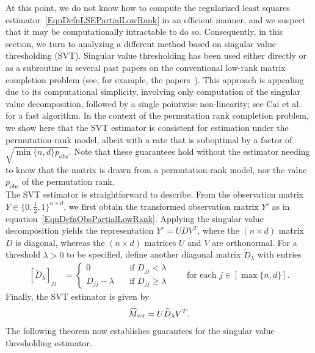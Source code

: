 \documentclass[11pt, hidelinks]{article} %
\newcommand{\numrows}{n}
\newcommand{\numcols}{d}
\newcommand{\wtmatrix}{M}
\newcommand{\wthat}{\widehat{\wtmatrix}}
\newcommand{\pp}{\ensuremath{p_{\mathrm{obs}}}}
\newcommand{\obs}{\ensuremath{Y}}
\newcommand{\regpar}{\ensuremath{\lambda}}
\newcommand{\Treg}{\ensuremath{\widetilde{D}_{\regpar}}}
\newcommand{\wthatSVT}{\wthat_{\mbox{\scalebox{.5}{SVT}}}}
\begin{document}
At this point, we do not know how to compute the regularized least
squares estimator~\eqref{EqnDefnLSEPartialLowRank} in an efficient
manner, and we suspect that it may be computationally intractable to do
so. Consequently, in this section, we turn to analyzing a different
method based on singular value thresholding (SVT). Singular value
thresholding has been used either directly or as a subroutine in
several past papers on the conventional low-rank matrix completion
problem (see, for example, the
papers~\cite{cai2010singular,donoho2014minimax,chatterjee2014matrix}).
This approach is appealing due to its computational simplicity,
involving only computation of the singular value decomposition,
followed by a single pointwise non-linearity; see Cai et
al.~\cite{cai2010fast} for a fast algorithm.  In the context of the
permutation rank completion problem, we show here that the SVT
estimator is consistent for estimation under the permutation-rank
model, albeit with a rate that is suboptimal by a factor of
$\sqrt{\min\{\numrows,\numcols\} \pp}$.  Note that these guarantees
hold without the estimator needing to know that the matrix is drawn
from a permutation-rank model, nor the value $\pp$ of the permutation
rank. \\

The SVT estimator is straightforward to describe.
From the observation matrix $\obs \in \{0,\frac{1}{2},1\}^{\numrows
  \times \numcols}$, we first obtain the transformed observation
matrix $\obs'$ as in equation~\eqref{EqnDefnObsPartialLowRank}.
Applying the singular value decomposition yields the representation
\mbox{$\obs' = U D V^T$,} where the $(\numrows \times \numcols)$
matrix $D$ is diagonal, whereas the $(\numrows \times \numcols)$
matrices $U$ and $V$ are orthonormal. For a threshold $\regpar > 0$ to
be specified, define another diagonal matrix $\Treg$ with entries
\begin{align}
\label{EqnDefnSoftSVT}
[\Treg]_{jj} & = 
\begin{cases}
0 & \quad \mbox{if $D_{jj} < \regpar$} \\
D_{jj} - \regpar  & \quad \mbox{if $D_{jj} \geq \regpar$}
\end{cases}
\qquad \mbox{for each $j \in [\max\{\numrows, \numcols\}]$.}
\end{align}
Finally, the SVT estimator is given by 
\begin{align*}
\wthatSVT =  U \Treg V^T.
\end{align*}  
The following theorem now establishes guarantees for the singular
value thresholding estimator.
%
\end{document}
